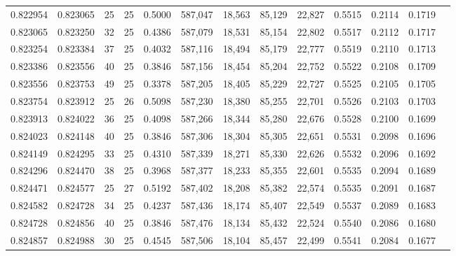 \begin{tabular}{rrrrrrrrrrrrr}
0.822954 & 0.823065 &    25 &  25 &                                     0.5000 & 587,047 &  18,563 &  85,129 &  22,827 & 0.5515 & 0.2114 & 0.1719 \\
0.823065 & 0.823250 &    32 &  25 &                                     0.4386 & 587,079 &  18,531 &  85,154 &  22,802 & 0.5517 & 0.2112 & 0.1717 \\
0.823254 & 0.823384 &    37 &  25 &                                     0.4032 & 587,116 &  18,494 &  85,179 &  22,777 & 0.5519 & 0.2110 & 0.1713 \\
0.823386 & 0.823556 &    40 &  25 &                                     0.3846 & 587,156 &  18,454 &  85,204 &  22,752 & 0.5522 & 0.2108 & 0.1709 \\
0.823556 & 0.823753 &    49 &  25 &                                     0.3378 & 587,205 &  18,405 &  85,229 &  22,727 & 0.5525 & 0.2105 & 0.1705 \\
0.823754 & 0.823912 &    25 &  26 &                                     0.5098 & 587,230 &  18,380 &  85,255 &  22,701 & 0.5526 & 0.2103 & 0.1703 \\
0.823913 & 0.824022 &    36 &  25 &                                     0.4098 & 587,266 &  18,344 &  85,280 &  22,676 & 0.5528 & 0.2100 & 0.1699 \\
0.824023 & 0.824148 &    40 &  25 &                                     0.3846 & 587,306 &  18,304 &  85,305 &  22,651 & 0.5531 & 0.2098 & 0.1696 \\
0.824149 & 0.824295 &    33 &  25 &                                     0.4310 & 587,339 &  18,271 &  85,330 &  22,626 & 0.5532 & 0.2096 & 0.1692 \\
0.824296 & 0.824470 &    38 &  25 &                                     0.3968 & 587,377 &  18,233 &  85,355 &  22,601 & 0.5535 & 0.2094 & 0.1689 \\
0.824471 & 0.824577 &    25 &  27 &                                     0.5192 & 587,402 &  18,208 &  85,382 &  22,574 & 0.5535 & 0.2091 & 0.1687 \\
0.824582 & 0.824728 &    34 &  25 &                                     0.4237 & 587,436 &  18,174 &  85,407 &  22,549 & 0.5537 & 0.2089 & 0.1683 \\
0.824728 & 0.824856 &    40 &  25 &                                     0.3846 & 587,476 &  18,134 &  85,432 &  22,524 & 0.5540 & 0.2086 & 0.1680 \\
0.824857 & 0.824988 &    30 &  25 &                                     0.4545 & 587,506 &  18,104 &  85,457 &  22,499 & 0.5541 & 0.2084 & 0.1677 \\

\end{tabular}
